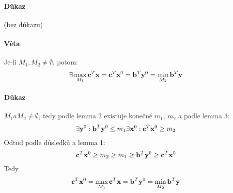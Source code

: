 \documentclass[a4paper,12pt,titlepage]{article}
\begin{document}
\paragraph{Důkaz} (bez důkazu)
\paragraph{Věta}
Je-li $M_1, M_2 \neq \emptyset$, potom:
\begin{align}
	\exists \max_{M_1} \mathbf{c}^T \mathbf{x} = \mathbf{c}^T \mathbf{x}^0 = \mathbf{b}^T\mathbf{y}^0 = \min_{M_2} \mathbf{b}^T
	\mathbf{y}
\end{align}
\paragraph{Důkaz}
$M_1 a M_2 \neq \emptyset$, tedy podle lemma 2 existuje konečné $m_1$, $m_2$ a podle
lemma 3:
\begin{align}
	\exists \mathbf{y}^0: \mathbf{b}^T \mathbf{y}^0 \le m_1
	\exists \mathbf{x}^0: \mathbf{c}^T \mathbf{x}^0 \ge m_2
\end{align}
Odtud podle důsledků a lemma 1:
\begin{align}
	\mathbf{c}^T\mathbf{x}^0 \ge m_2 \ge m_1 \ge \mathbf{b}^T \mathbf{y}^0 \ge \mathbf{c}^T\mathbf{x}^0
\end{align}
Tedy 
\begin{align}
	\mathbf{c}^T\mathbf{x}^0 = \max_{M_1} \mathbf{c}^T\mathbf{x} = \mathbf{b}^T \mathbf{y}^0 = \min_{M_2} \mathbf{b}^T\mathbf{y}
\end{align}
\end{document}

